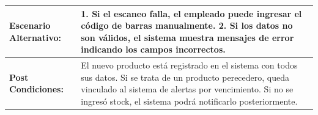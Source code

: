\documentclass[twoside]{article}
\begin{document}
\begin{table}[!htbp]
\begin{tabular}{|l|p{29em}|}
\midrule
\rowcolor[rgb]{ .635, .973, .882} \textbf{Escenario Alternativo:} & \cellcolor[rgb]{ .867, .922, .969} 1. Si el escaneo falla, el empleado puede ingresar el código de barras manualmente.\newline{} 2. Si los datos no son válidos, el sistema muestra mensajes de error indicando los campos incorrectos. \\
\midrule
\rowcolor[rgb]{ .635, .973, .882} \textbf{Post Condiciones:} & \cellcolor[rgb]{ .867, .922, .969} El nuevo producto está registrado en el sistema con todos sus datos. Si se trata de un producto perecedero, queda vinculado al sistema de alertas por vencimiento. Si no se ingresó stock, el sistema podrá notificarlo posteriormente. \\
\bottomrule
\end{tabular}
\label{tab:addlabel}
\end{table}
\newpage
\end{document}
